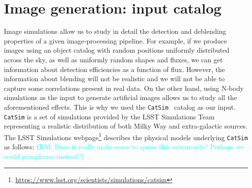 \documentclass[twocolumn]{aastex62}
\newcommand{\rachel}[1]{{\textcolor{cyan}{{\textbf (RM: #1)}}}}
\begin{document}
\section{Image generation: input catalog}
\label{sec:inputs}
Image simulations allow us to study in detail the detection and deblending properties of a given image-processing pipeline. For example, if we produce images using an object catalog with random positions uniformly distributed across the sky, as well as uniformly random shapes and fluxes, we can get information about detection efficiencies as a function of flux.  However, the information about blending will not be realistic and we will not be able to capture some correlations present in real data. On the other hand, using N-body simulations as the input to generate artificial images allows us to study all the aforementioned effects. This is why we used the \texttt{CatSim}~\citep{2010SPIE.7738E..1OC,2014SPIE.9150E..14C} catalog as our input.  \texttt{CatSim} is a set of simulations provided by the LSST Simulations Team representing a realistic distribution of both Milky Way and extra-galactic sources.  The LSST Simulations webpage\footnote{\url{https://www.lsst.org/scientists/simulations/catsim}} describes the physical models underlying \texttt{CatSim} as follows:
\rachel{Does it really make sense to quote this extensively?  Perhaps we could paraphrase instead?}
\end{document}
